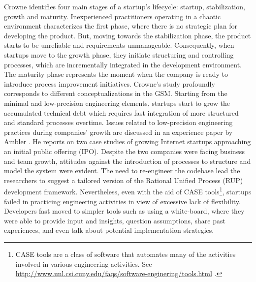 \documentclass[10pt,journal,letterpaper,compsoc]{IEEEtran}
\begin{document}
Crowne \cite{Crowne2002} identifies four main stages of a startup's lifecycle: 
startup, stabilization, growth and maturity. Inexperienced practitioners 
operating in a chaotic environment characterizes the first phase, where there is 
no strategic plan for developing the product. But, moving towards the 
stabilization phase, the product starts to be unreliable and requirements 
unmanageable. Consequently, when startups move to the growth phase, they 
initiate structuring and controlling processes, which are incrementally 
integrated in the development environment. The maturity phase represents the 
moment when the company is ready to introduce process improvement initiatives. 
Crowne's study profoundly corresponds to different conceptualizations in the 
GSM. Starting from the minimal and low-precision engineering elements, startups 
start to grow the accumulated technical debt which requires fast integration of 
more structured and standard processes overtime.
Issues related to low-precision engineering practices during companies' growth 
are discussed in an experience paper by Ambler \cite{Ambler2002}. He reports on 
two case studies of growing Internet startups approaching an initial public  
offering (IPO). %
Despite the two companies were facing business and team growth, attitudes 
against the introduction of processes to structure and model the system were 
evident. The need to re-engineer the codebase lead the researchers to suggest a 
tailored version of the Rational Unified Process (RUP) 
development framework. Nevertheless, even with the aid of CASE 
tools\footnote{CASE tools are a class of software that automates many of the 
activities involved in various engineering activities. See 
\url{http://www.unl.csi.cuny.edu/faqs/software-enginering/tools.html} .}, 
startups failed in practicing engineering activities in view of excessive lack of 
flexibility. Developers fast moved to simpler tools such as using a white-board, 
where they were able to provide input and insights, question assumptions, share 
past experiences, and even talk about potential implementation strategies. 
\end{document}
